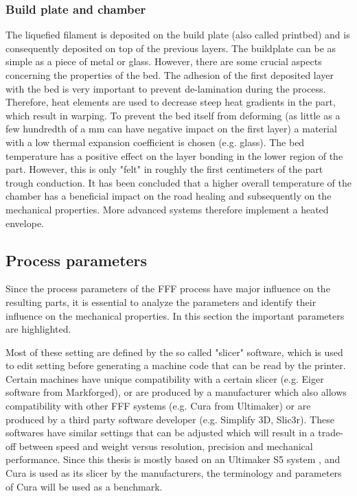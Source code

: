 \subsubsection{Build plate and chamber}
    \label{Build plate and chamber}
The liquefied filament is deposited on the build plate (also called printbed) and is consequently deposited on top of the previous layers. The buildplate can be as simple as a piece of metal or glass. However, there are some crucial aspects concerning the properties of the bed. The adhesion of the first deposited layer with the bed is very important to prevent de-lamination during the process. Therefore, heat elements are used to decrease steep heat gradients in the part, which result in warping. To prevent the bed itself from deforming (as little as a few hundredth of a mm can have negative impact on the first layer) a material with a low thermal expansion coefficient is chosen (e.g. glass). The bed temperature has a positive effect on the layer bonding in the lower region of the part. However, this is only "felt" in roughly the first centimeters of the part trough conduction. It has been concluded that a higher overall temperature of the chamber has a beneficial impact on the road healing and subsequently on the mechanical properties\cite{VeenEnhancingTemperature}. More advanced systems therefore implement a heated envelope.

\subsection{Process parameters}
    \label{Process parameters}
Since the process parameters of the FFF process have major influence on the resulting parts, it is essential to analyze the parameters and identify their influence on the mechanical properties. In this section the important parameters are highlighted.

Most of these setting are defined by the so called "slicer" software, which is used to edit setting before generating a machine code that can be read by the printer. Certain machines have unique compatibility with a certain slicer (e.g. Eiger software from Markforged), or are produced by a manufacturer which also allows compatibility with other FFF systems (e.g. Cura from Ultimaker) or are produced  by a third party software developer (e.g. Simplify 3D, Slic3r). These softwares have similar settings that can be adjusted which will result in a  trade-off between speed and weight versus resolution, precision and mechanical performance. Since this thesis is mostly based on an Ultimaker S5 system \cite{UltimakerUltimakerS5}, and Cura is used as its slicer by the manufacturers, the terminology and parameters of Cura will be used as a benchmark. 

